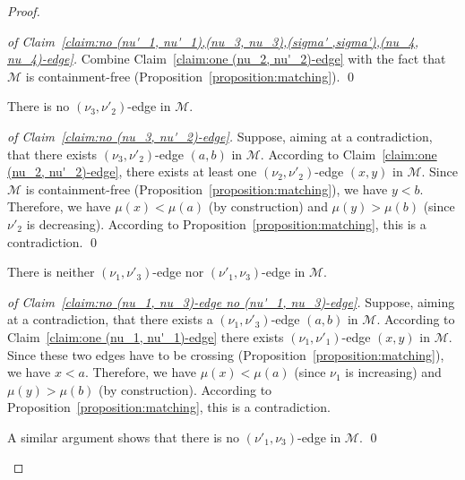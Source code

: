 \documentclass[a4paper,10pt]{llncs}
\begin{document}
\begin{proof}
  \begin{proof}[of Claim~\ref{claim:no (nu'_1, nu'_1),(nu_3, nu_3),(sigma' ,sigma'),(nu_4, nu_4)-edge}]
    Combine Claim~\ref{claim:one (nu_2, nu'_2)-edge} with the fact that
    $\mathcal{M}$ is containment-free (Proposition~\ref{proposition:matching}).
    \qed
  \end{proof}

  \begin{claim}
    \label{claim:no (nu_3, nu'_2)-edge}
    There is no $(\nu_3, \nu'_2)$-edge in $\mathcal{M}$.
  \end{claim}

  \begin{proof}[of Claim~\ref{claim:no (nu_3, nu'_2)-edge}]
    Suppose, aiming at a contradiction, that there exists
    $(\nu_3, \nu'_2)$-edge $(a, b)$ in $\mathcal{M}$.
    According to Claim~\ref{claim:one (nu_2, nu'_2)-edge}, there
    exists at least one $(\nu_2, \nu'_2)$-edge $(x, y)$ in $\mathcal{M}$.
    Since $\mathcal{M}$ is containment-free (Proposition~\ref{proposition:matching}),
    we have $y < b$.
    Therefore,
    we have $\mu(x) < \mu(a)$ (by construction) and
    $\mu(y) > \mu(b)$ (since $\nu'_2$ is decreasing).
    According to Proposition~\ref{proposition:matching}, this is
    a contradiction.
    \qed
  \end{proof}

  \begin{claim}
    \label{claim:no (nu_1, nu_3)-edge no (nu'_1, nu_3)-edge}
    There is neither $(\nu_1, \nu'_3)$-edge nor $(\nu'_1, \nu_3)$-edge
    in $\mathcal{M}$.
  \end{claim}

  \begin{proof}[of Claim~\ref{claim:no (nu_1, nu_3)-edge no (nu'_1, nu_3)-edge}]
    Suppose, aiming at a contradiction, that there exists a
    $(\nu_1, \nu'_3)$-edge $(a, b)$ in $\mathcal{M}$.
    According to Claim~\ref{claim:one (nu_1, nu'_1)-edge} there exists
    $(\nu_1, \nu'_1)$-edge $(x, y)$ in $\mathcal{M}$.
    Since these two edges have to be crossing
    (Proposition~\ref{proposition:matching}), we have $x < a$.
    Therefore, we have
    $\mu(x) < \mu(a)$ (since $\nu_1$ is increasing)
    and
    $\mu(y) > \mu(b)$ (by construction).
    According to Proposition~\ref{proposition:matching}, this is
    a contradiction.

    A similar argument shows that there is no
    $(\nu'_1, \nu_3)$-edge in $\mathcal{M}$.
    \qed
  \end{proof}


\end{proof}
\end{document}
